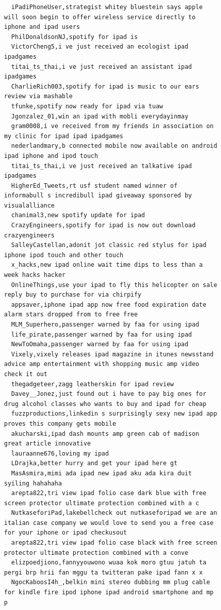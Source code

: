 \begin{figure}[htpb]
\begin{verbatim}
  iPadiPhoneUser,strategist whitey bluestein says apple will soon begin to offer wireless service directly to iphone and ipad users
  PhilDonaldsonNJ,spotify for ipad is
  VictorCheng5,i ve just received an ecologist ipad ipadgames
  titai_ts_thai,i ve just received an assistant ipad ipadgames
  CharlieRich003,spotify for ipad is music to our ears review via mashable
  tfunke,spotify now ready for ipad via tuaw
  Jgonzalez_01,win an ipad with mobli everydayinmay
  gram0008,i ve received from my friends in association on my clinic for ipad ipad ipadgames
  nederlandmary,b connected mobile now available on android ipad iphone and ipod touch
  titai_ts_thai,i ve just received an talkative ipad ipadgames
  HigherEd_Tweets,rt usf student named winner of informabull s incredibull ipad giveaway sponsored by visualalliance
  chanimal3,new spotify update for ipad
  CrazyEngineers,spotify for ipad is now out download crazyengineers
  SalleyCastellan,adonit jot classic red stylus for ipad iphone ipod touch and other touch
  x_hacks,new ipad online wait time dips to less than a week hacks hacker
  OnlineThings,use your ipad to fly this helicopter on sale reply buy to purchase for via chirpify
  appsaver,iphone ipad app now free food expiration date alarm stars dropped from to free free
  MLM_Superhero,passenger warned by faa for using ipad
  life_pirate,passenger warned by faa for using ipad
  NewToOmaha,passenger warned by faa for using ipad
  Vixely,vixely releases ipad magazine in itunes newsstand advice amp entertainment with shopping music amp video check it out
  thegadgeteer,zagg leatherskin for ipad review
  Davey__Jonez,just found out i have to pay big ones for drug alcohol classes who wants to buy and ipad for cheap
  fuzzproductions,linkedin s surprisingly sexy new ipad app proves this company gets mobile
  akucharski,ipad dash mounts amp green cab of madison great article innovative
  lauraanne676,loving my ipad
  LDrajka,better hurry and get your ipad here gt
  MasAsmira,mimi ada ipad new ipad aku ada kira duit syiling hahahaha
  arepta822,tri view ipad folio case dark blue with free screen protector ultimate protection combined with a c
  NutkaseforiPad,lakebellcheck out nutkaseforipad we are an italian case company we would love to send you a free case for your iphone or ipad checkusout
  arepta822,tri view ipad folio case black with free screen protector ultimate protection combined with a conve
  elizpoedjiono,fannyyouwono wuaa kok moro gtuu jatuh ta pergi brp hrii fan mggu ta twitteran pake ipad fann x x
  NgocKaboosI4h_,belkin mini stereo dubbing mm plug cable for kindle fire ipod iphone ipad android smartphone and mp p

\end{verbatim}
\end{figure}
